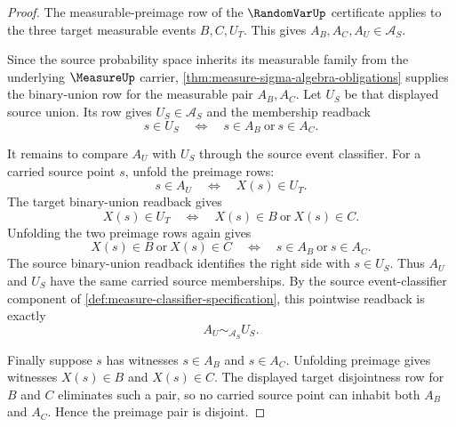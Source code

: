 \begin{proof}
The measurable-preimage row of the $\RandomVarUp$ certificate applies to the three target measurable events $B,C,U_T$. This gives $A_B,A_C,A_U\in\mathcal{A}_S$.

Since the source probability space inherits its measurable family from the underlying $\MeasureUp$ carrier, \autoref{thm:measure-sigma-algebra-obligations} supplies the binary-union row for the measurable pair $A_B,A_C$. Let $U_S$ be that displayed source union. Its row gives $U_S\in\mathcal{A}_S$ and the membership readback
$$
s\in U_S\quad\Longleftrightarrow\quad s\in A_B\ \text{or}\ s\in A_C.
$$

It remains to compare $A_U$ with $U_S$ through the source event classifier. For a carried source point $s$, unfold the preimage rows:
$$
s\in A_U\quad\Longleftrightarrow\quad X(s)\in U_T.
$$
The target binary-union readback gives
$$
X(s)\in U_T\quad\Longleftrightarrow\quad X(s)\in B\ \text{or}\ X(s)\in C.
$$
Unfolding the two preimage rows again gives
$$
X(s)\in B\ \text{or}\ X(s)\in C
\quad\Longleftrightarrow\quad
s\in A_B\ \text{or}\ s\in A_C.
$$
The source binary-union readback identifies the right side with $s\in U_S$. Thus $A_U$ and $U_S$ have the same carried source memberships. By the source event-classifier component of \autoref{def:measure-classifier-specification}, this pointwise readback is exactly
$$
A_U\sim_{\mathcal{A}_S}U_S.
$$

Finally suppose $s$ has witnesses $s\in A_B$ and $s\in A_C$. Unfolding preimage gives witnesses $X(s)\in B$ and $X(s)\in C$. The displayed target disjointness row for $B$ and $C$ eliminates such a pair, so no carried source point can inhabit both $A_B$ and $A_C$. Hence the preimage pair is disjoint.
\end{proof}

